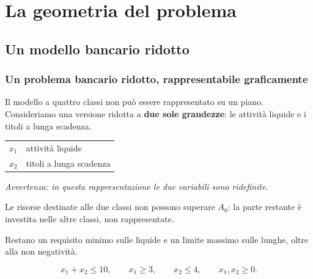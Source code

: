 \section{La geometria del problema}



\subsection{Un modello bancario ridotto}%

\begin{frame}%
%

\frametitle{Un problema bancario ridotto, rappresentabile graficamente}%
%

%


Il modello a quattro classi non pu\`{o} essere rappresentato su un piano.
Consideriamo una versione ridotta a \textbf{due sole grandezze}: le
attivit\`{a} liquide e i titoli a lunga scadenza.

\medskip

\begin{center}
{\small
\begin{tabular}
[c]{ll}\hline
$x_{1}$ & attivit\`{a} liquide\\
$x_{2}$ & titoli a lunga scadenza\\\hline
\end{tabular}
}

{\small \emph{Avvertenza: in questa rappresentazione le due variabili sono
ridefinite. }}
\end{center}

\medskip

\begin{stepitemize}
\item Le risorse destinate alle due classi non possono superare $A_{0}$: la
parte restante \`{e} investita nelle altre classi, non rappresentate.

\item Restano un requisito minimo sulle liquide e un limite massimo sulle
lunghe, oltre alla non negativit\`{a}.
\end{stepitemize}

%

\[
x_{1}+x_{2}\leq10, \qquad x_{1}\geq3, \qquad x_{2}\leq4, \qquad x_{1}%
,x_{2}\geq0.
\]
%

\transboxout
\end{frame}%



